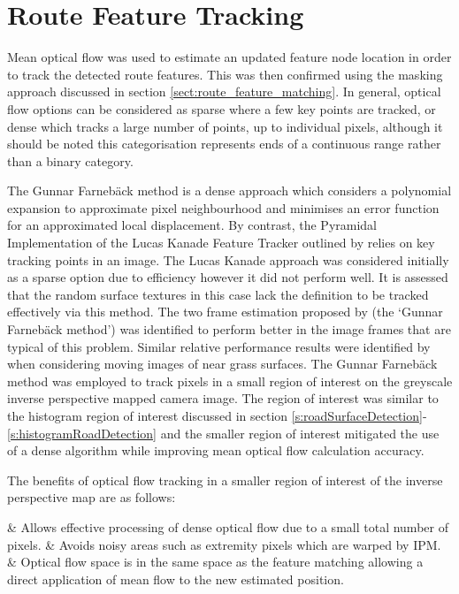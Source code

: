 \documentclass[]{aiaa-tc}%
\begin{document}
\section{Route Feature Tracking}\label{s:roadFeatureTracking}

Mean optical flow was used to estimate an updated feature node location in order to track the detected route features. This was then confirmed using the masking approach discussed in section \ref{sect:route_feature_matching}. In general, optical flow options can be considered as sparse where a few key points are tracked, or dense which tracks a large number of points, up to individual pixels, although it should be noted this categorisation represents ends of a continuous range rather than a binary category. 

The Gunnar Farneb{\"a}ck method \citep{opticalFlowSolution} is a dense approach which considers a polynomial expansion to approximate pixel neighbourhood and minimises an error function for an approximated local displacement. By contrast, the Pyramidal Implementation of the Lucas Kanade Feature Tracker outlined by \citet{opticalFlowLKPyramidal} relies on key tracking points in an image. The Lucas Kanade approach was considered initially as a sparse option due to efficiency however it did not perform well. It is assessed that the random surface textures in this case lack the definition to be tracked effectively via this method. The two frame estimation proposed by \citet{opticalFlowSolution} (the `Gunnar Farneb{\"a}ck method') was identified to perform better in the image frames that are typical of this problem. Similar relative performance results were identified by \citet{opticalFlowLKvsDenseUAV} when considering moving images of near grass surfaces. The Gunnar Farneb{\"a}ck method was employed to track pixels in a small region of interest on the greyscale inverse perspective mapped camera image. The region of interest was similar to the histogram region of interest discussed in section \ref{s:roadSurfaceDetection}-\ref{s:histogramRoadDetection} and the smaller region of interest mitigated the use of a dense algorithm while improving mean optical flow calculation accuracy.

The benefits of optical flow tracking in a smaller region of interest of the inverse perspective map are as follows:
\begin{easylist}
	& Allows effective processing of dense optical flow due to a small total number of pixels.
	& Avoids noisy areas such as extremity pixels which are warped by IPM.
	& Optical flow space is in the same space as the feature matching allowing a direct application of mean flow to the new estimated position.
\end{easylist}
\end{document}
